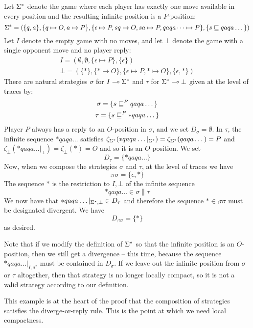 \documentclass{entcs} \usepackage{prentcsmacro}
\newcommand{\0}{{\mathtt{0}}}
\begin{document}
\begin{example}
  Let ${\Sigma^*}$ denote the game where each player has exactly one move available in every position and the resulting infinite position is a $P$-position:
  \[
    {\Sigma^*} = (\{q, a\}, \{q\mapsto O, a\mapsto P\}, \{\epsilon\mapsto P,sq\mapsto O,sa\mapsto P,qaqa\dots\mapsto P\}, \{s\sqsubseteq qaqa\dots\})
    \]
  Let $I$ denote the empty game with no moves, and let $\bot$ denote the game with a single opponent move and no player reply:
  \begin{gather*}
    I = (\emptyset, \emptyset, \{\epsilon\mapsto P\}, \{\epsilon\}) \\
    \bot = (\{*\}, \{*\mapsto O\}, \{\epsilon\mapsto P, *\mapsto O\}, \{\epsilon, *\})
  \end{gather*}
  There are natural strategies $\sigma$ for $I\multimap{\Sigma^*}$ and $\tau$ for ${\Sigma^*}\multimap\bot$ given at the level of traces by:
  \begin{gather*}
    \sigma = \{s \sqsubseteq^P qaqa\dots\} \\
    \tau = \{s \sqsubseteq^P *qaqa\dots\}
  \end{gather*}
  Player $P$ always has a reply to an $O$-position in $\sigma$, and we set $D_\sigma = \emptyset$.  In $\tau$, the infinite sequence $*qaqa\dots$ satisfies $\zeta_{{\Sigma^*}}(*qaqa\dots\vert_{{\Sigma^*}}) = \zeta_{{\Sigma^*}}(qaqa\dots) = P$ and $\zeta_{\bot}(*qaqa\dots\vert_{\bot}) = \zeta_{\bot}(*) = O$ and so it is an $O$-position.  We set
  \[
    D_\tau = \{*qaqa\dots\}
    \]
  Now, when we compose the strategies $\sigma$ and $\tau$, at the level of traces we have
  \[
    \comp\tau\sigma = \{\epsilon, *\}
    \]
  The sequence $*$ is the restriction to $I,\bot$ of the infinite sequence
  \[
    *qaqa\dots \in \sigma\|\tau
    \]
  We now have that $*qaqa\dots\vert_{{\Sigma^*},\bot}\in D_\tau$ and therefore the sequence $*\in\comp\tau\sigma$ must be designated divergent.  We have
  \[
    D_{\comp\tau\sigma} = \{*\}
    \]
  as desired.

  Note that if we modify the definition of ${\Sigma^*}$ so that the infinite position is an $O$-position, then we still get a divergence -- this time, because the sequence $*qaqa\dots\vert_{I,\sigma^*}$ must be contained in $D_\sigma$.  If we leave out the infinite position from $\sigma$ or $\tau$ altogether, then that strategy is no longer locally compact, so it is not a valid strategy according to our definition.
\end{example}

This example is at the heart of the proof that the composition of strategies satisfies the diverge-or-reply rule.  This is the point at which we need local compactness.
\end{document}
